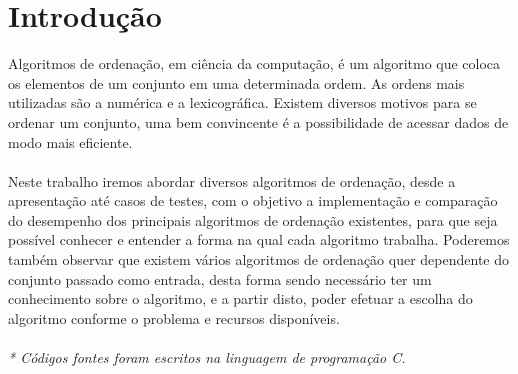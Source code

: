 \documentclass[
	12pt,				%
	oneside,			%
	a4paper,			%
	english,			%
	brazil,				%
	]{article}
\begin{document}
\section{Introdução}
Algoritmos de ordenação, em ciência da computação, é um algoritmo que coloca os elementos de um conjunto em uma determinada ordem. As ordens mais utilizadas são 
a numérica e a lexicográfica. Existem diversos motivos para se ordenar um conjunto, uma bem convincente  é a possibilidade de acessar dados de modo mais eficiente.\\
\\ \indent Neste trabalho iremos abordar diversos algoritmos de ordenação, desde a apresentação até casos de testes, com o objetivo a implementação e comparação do desempenho dos principais algoritmos de ordenação existentes,
para que seja possível conhecer e entender a forma na qual cada algoritmo trabalha. Poderemos também observar que existem vários algoritmos de ordenação quer 
dependente do conjunto passado como entrada, desta forma sendo necessário ter um conhecimento sobre o algoritmo, e a partir disto, poder efetuar a escolha 
do algoritmo conforme o problema e recursos disponíveis.\\
\\ \indent \textit{* Códigos fontes foram escritos na linguagem de programação C.}

\end{document}

